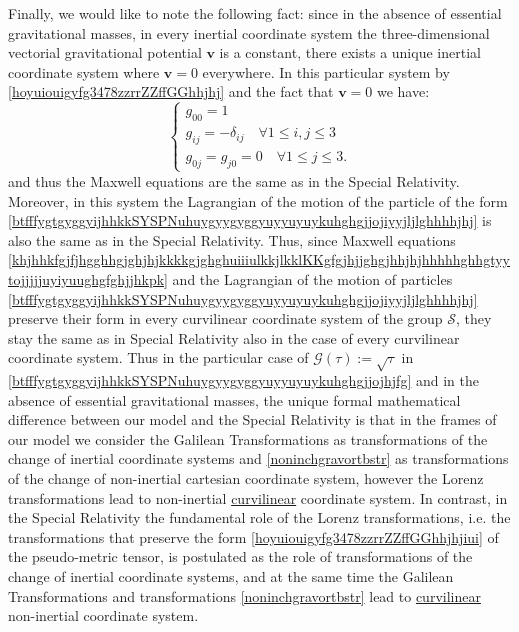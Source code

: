 \documentclass{article}
\theoremstyle{definition}
\theoremstyle{remark}
\renewcommand{\vec}[1]{\mathbf{#1}}
\newcommand{\er}{\eqref}
\newcommand{\er}{\eqref}
\begin{document}
Finally, we would like to note the following fact: since in the
absence of essential gravitational masses, in every inertial
coordinate system the three-dimensional vectorial gravitational
potential $\vec v$ is a constant,
there exists a
unique inertial coordinate system where $\vec v=0$ everywhere. In
this particular system by \er{hoyuiouigyfg3478zzrrZZffGGhhjhj} and
the fact that $\vec v=0$ we have:
\begin{equation}\label{hoyuiouigyfg3478zzrrZZffGGhhjhjiui}
\begin{cases}
g_{00}=1\\
g_{ij}=-\delta_{ij}\quad\forall 1\leq i,j\leq 3\\
g_{0j}=g_{j0}=0\quad\forall 1\leq j\leq 3.
\end{cases}
\end{equation}
and thus the Maxwell equations are the same as in the Special
Relativity. Moreover, in this system the Lagrangian of the motion of
the particle of the form
\er{btfffygtgyggyijhhkkSYSPNuhuygyygyggyuyyuyuykuhghgjjojiyyjljlghhhhjhj}
is also the same as in the Special Relativity. Thus, since Maxwell
equations
\er{khjhhkfgjfjhgghhgjghjhjkkkkgjghghuiiiulkkjlkklKKgfgjhjjghgjhhjhjhhhhhghhgtyytojjjjjuyiyuughgfghjjhkpk}
and the Lagrangian of the motion of particles
\er{btfffygtgyggyijhhkkSYSPNuhuygyygyggyuyyuyuykuhghgjjojiyyjljlghhhhjhj}
preserve their form in every curvilinear coordinate system of the
group $\mathcal{S}$, they stay the same as in Special Relativity
also in the case of every curvilinear coordinate system. Thus in the
particular case of $\mathcal{G}(\tau):=\sqrt{\tau}$ in
\er{btfffygtgyggyijhhkkSYSPNuhuygyygyggyuyyuyuykuhghgjjojhjfg} and
in the absence of essential gravitational masses, the unique formal
mathematical difference between our model and the Special Relativity
is that in the frames of our model we consider the Galilean
Transformations as transformations of the change of inertial
coordinate systems and \er{noninchgravortbstr} as transformations of
the change of non-inertial cartesian coordinate system, however the
Lorenz transformations lead to non-inertial \underline{curvilinear}
coordinate system. In contrast, in the Special Relativity the
fundamental role of the Lorenz transformations, i.e. the
transformations that preserve the form
\er{hoyuiouigyfg3478zzrrZZffGGhhjhjiui} of the pseudo-metric tensor,
is postulated as the role of transformations of the change of
inertial coordinate systems, and at the same time the Galilean
Transformations and transformations \er{noninchgravortbstr} lead to
\underline{curvilinear} non-inertial coordinate system.
\end{document}
